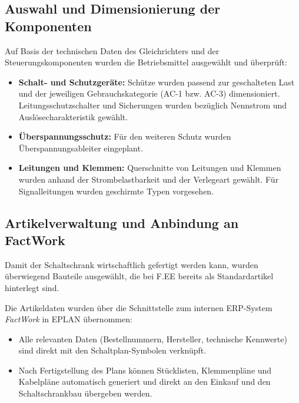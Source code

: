 \subsection{Auswahl und Dimensionierung der Komponenten}
Auf Basis der technischen Daten des Gleichrichters und der Steuerungskomponenten wurden die Betriebsmittel ausgewählt und überprüft:
\begin{itemize}
    \item \textbf{Schalt- und Schutzgeräte:} Schütze wurden passend zur geschalteten Last und der jeweiligen Gebrauchskategorie (AC-1 bzw. AC-3) dimensioniert.
          Leitungsschutzschalter und Sicherungen wurden bezüglich Nennstrom und Auslösecharakteristik gewählt.
    \item \textbf{Überspannungsschutz:} Für den weiteren Schutz wurden Überspannungsableiter eingeplant.
    \item \textbf{Leitungen und Klemmen:} Querschnitte von Leitungen und Klemmen wurden anhand der Strombelastbarkeit und der Verlegeart gewählt.
          Für Signalleitungen wurden geschirmte Typen vorgesehen.
\end{itemize}

\subsection{Artikelverwaltung und Anbindung an FactWork}
Damit der Schaltschrank wirtschaftlich gefertigt werden kann, wurden überwiegend Bauteile ausgewählt, die bei F.EE bereits als Standardartikel hinterlegt sind.

Die Artikeldaten wurden über die Schnittstelle zum internen ERP-System \textit{FactWork} in EPLAN übernommen:
\begin{itemize}
    \item Alle relevanten Daten (Bestellnummern, Hersteller, technische Kennwerte) sind direkt mit den Schaltplan-Symbolen verknüpft.
    \item Nach Fertigstellung des Plans können Stücklisten, Klemmenpläne und Kabelpläne automatisch generiert und direkt an den Einkauf und den Schaltschrankbau übergeben werden.
\end{itemize}